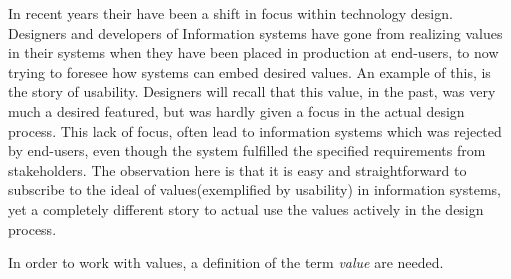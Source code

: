 In recent years their have been a shift in focus within technology design. Designers and developers of Information systems have gone from realizing values in their systems when they have been placed in production at end-users, to now trying to foresee how systems can embed desired values.\newline 
An example of this, is the story of usability. Designers will recall that this value, in the past, was very much a desired featured, but was hardly given a focus in the actual design process. This lack of focus, often lead to information systems which was rejected by end-users, even though the system fulfilled the specified requirements from stakeholders.\newline
The observation here is that it is easy and straightforward to subscribe to the ideal of values(exemplified by usability) in information systems, yet a completely different story to actual use the values actively in the design process.

In order to work with values, a definition of the term \textit{value} are needed. 
 \newline



